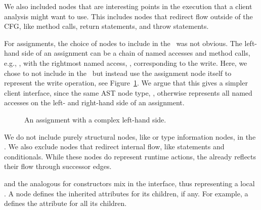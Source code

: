 We also included nodes that are interesting points in the execution that a client analysis might want to use.
This includes nodes that redirect flow outside of the CFG, like method calls, return statements, and throw statements.

For assignments, the choice of nodes to include in the \CFG\ was not obvious.
The left-hand side of an assignment can be a chain of named accesses and method calls, e.g., , with the rightmost named access, , corresponding to the write.
Here, we chose to not include  in the \CFG\, but instead use the assignment node itself
to represent the write operation, see Figure~\ref{fig:AssigExpr}.
We argue that this gives a simpler client interface, since the same AST node type, , otherwise represents all named accesses on the left- and right-hand side of an assignment.

\begin{figure}[H]
  \centering
   \scalebox{0.85}{
     
     }
     \caption{An assignment with a complex left-hand side.
}
	\label{fig:AssigExpr}
\end{figure}

We do not include purely structural nodes, like  or type information nodes, in the {\CFG}.
We also exclude
nodes that redirect internal flow, like  statements and conditionals.
While these nodes do represent runtime actions, the {\CFG} already reflects their flow through successor edges.


 and the analogous  for constructors mix in the  interface, thus representing a local \CFG.
A  node defines the inherited attributes for its  children, if any.
For example, a  defines the  attribute for all its children.


